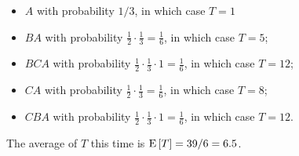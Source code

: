 \documentclass[11pt,twoside]{article}
\begin{document}
\begin{problem}
\begin{problemparts}
{\begin {itemize}

\item
$A$ with probability $1/3$, in which case $T=1$

\item
$BA$ with probability $\frac 12 \cdot \frac 13 = \frac 16$, in which
case $T=5$;

\item
$BCA$ with probability $\frac 12 \cdot \frac 13 \cdot 1 = \frac 16$,
in which case $T=12$;

\item
$CA$ with probability $\frac 12 \cdot \frac 13  = \frac 16$, in which case $T=8$;

\item
$CBA$ with probability $\frac 12 \cdot \frac 13 \cdot 1 = \frac 16$, in which
case $T=12$.

\end {itemize}

The average of $T$ this time is $\mathop{\textup{E}}\nolimits\left[T\right] = 39/6 = 6.5$.
}
\end{problemparts}
\end{problem}


\end{document}
